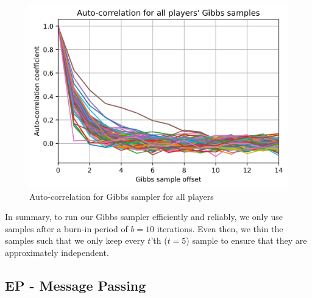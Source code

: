\documentclass[]{article}
\newcommand{\figwidth}{0.6\linewidth}
\begin{document}
\begin{figure}[!h]
	\centering
	\includegraphics[width=\figwidth]{auto-cor.png}
	\caption{Auto-correlation for Gibbs sampler for all players}
	\label{fig:auto-cor}
\end{figure}

In summary, to run our Gibbs sampler efficiently and reliably, we only use samples after a burn-in period of $b=10$ iterations. Even then, we thin the samples such that we only keep every $t$'th ($t=5$) sample to ensure that they are approximately independent.

\subsection{EP - Message Passing}
\end{document}
